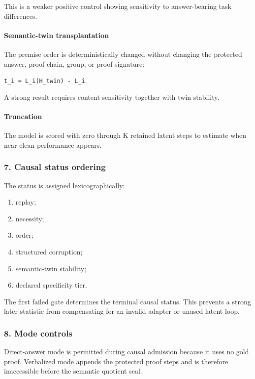 \documentclass[
  10pt,
]{article}
\providecommand{\tightlist}{%
  \setlength{\itemsep}{0pt}\setlength{\parskip}{0pt}}
\begin{document}
This is a weaker positive control showing sensitivity to answer-bearing
task differences.

\paragraph{Semantic-twin
transplantation}\label{semantic-twin-transplantation}

The premise order is deterministically changed without changing the
protected answer, proof chain, group, or proof signature:

\texttt{t\_i\ =\ L\_i(H\_twin)\ -\ L\_i}.

A strong result requires content sensitivity together with twin
stability.

\paragraph{Truncation}\label{truncation}

The model is scored with zero through K retained latent steps to
estimate when near-clean performance appears.

\subsubsection{7. Causal status ordering}\label{causal-status-ordering}

The status is assigned lexicographically:

\begin{enumerate}
\def\labelenumi{\arabic{enumi}.}
\tightlist
\item
  replay;
\item
  necessity;
\item
  order;
\item
  structured corruption;
\item
  semantic-twin stability;
\item
  declared specificity tier.
\end{enumerate}

The first failed gate determines the terminal causal status. This
prevents a strong later statistic from compensating for an invalid
adapter or unused latent loop.

\subsubsection{8. Mode controls}\label{mode-controls}

Direct-answer mode is permitted during causal admission because it uses
no gold proof. Verbalized mode appends the protected proof steps and is
therefore inaccessible before the semantic quotient seal.
\end{document}
